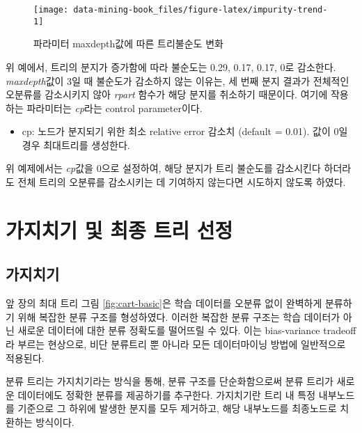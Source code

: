 \documentclass[
]{book}
\providecommand{\tightlist}{%
  \setlength{\itemsep}{0pt}\setlength{\parskip}{0pt}}
\begin{document}
\begin{figure}

{\centering \texttt{[image: data-mining-book\_files/figure-latex/impurity-trend-1]} 

}

\caption{파라미터 maxdepth값에 따른 트리불순도 변화}\label{fig:impurity-trend}
\end{figure}

위 예에서, 트리의 분지가 증가함에 따라 불순도는 0.29, 0.17, 0.17, 0로 감소한다. \emph{maxdepth}값이 3일 때 불순도가 감소하지 않는 이유는, 세 번째 분지 결과가 전체적인 오분류를 감소시키지 않아 \emph{rpart} 함수가 해당 분지를 취소하기 때문이다. 여기에 작용하는 파라미터는 \emph{cp}라는 control parameter이다.

\begin{itemize}
\tightlist
\item
  cp: 노드가 분지되기 위한 최소 relative error 감소치 (default = 0.01). 값이 0일 경우 최대트리를 생성한다.
\end{itemize}

위 예제에서는 \emph{cp}값을 0으로 설정하여, 해당 분지가 트리 불순도를 감소시킨다 하더라도 전체 트리의 오분류를 감소시키는 데 기여하지 않는다면 시도하지 않도록 하였다.

\hypertarget{cart-pruning-complete}{%
\section{가지치기 및 최종 트리 선정}\label{cart-pruning-complete}}

\hypertarget{cart-pruning}{%
\subsection{가지치기}\label{cart-pruning}}

앞 장의 최대 트리 그림 \ref{fig:cart-basic}은 학습 데이터를 오분류 없이 완벽하게 분류하기 위해 복잡한 분류 구조를 형성하였다. 이러한 복잡한 분류 구조는 학습 데이터가 아닌 새로운 데이터에 대한 분류 정확도를 떨어뜨릴 수 있다. 이는 bias-variance tradeoff라 부르는 현상으로, 비단 분류트리 뿐 아니라 모든 데이터마이닝 방법에 일반적으로 적용된다.

분류 트리는 가지치기라는 방식을 통해, 분류 구조를 단순화함으로써 분류 트리가 새로운 데이터에도 정확한 분류를 제공하기를 추구한다. 가지치기란 트리 내 특정 내부노드를 기준으로 그 하위에 발생한 분지를 모두 제거하고, 해당 내부노드를 최종노드로 치환하는 방식이다.
\end{document}
